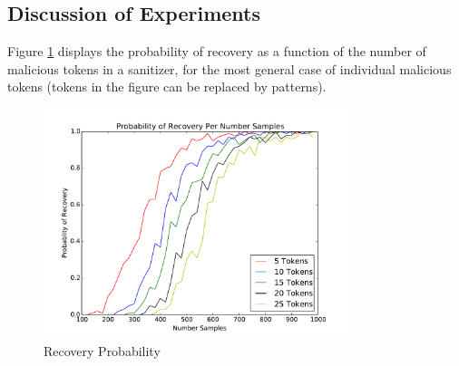 \subsection{Discussion of Experiments}
Figure \ref{fig:recovery_probability} displays the probability of recovery as a function of the number of malicious tokens in a sanitizer, for the most general case of individual malicious tokens (tokens in the figure can be replaced by patterns). 
\begin{figure}[!thb]
	\centering
	\includegraphics[width=3.5in]{./recovery_probability_per_samples.pdf}
	\caption{Recovery Probability}
	\label{fig:recovery_probability}
\end{figure}

